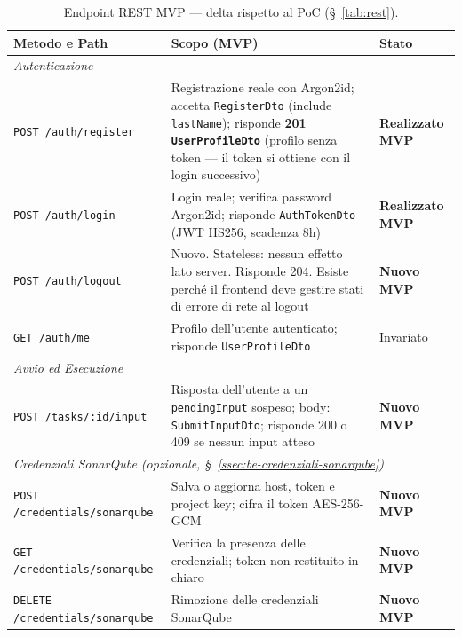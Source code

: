 \documentclass[11pt,a4paper]{article}
\begin{document}
\begin{table}[H]
\centering
\caption{Endpoint REST MVP --- delta rispetto al PoC (\S~\ref{tab:rest}).}
\label{tab:be-endpoint-delta}
\vspace{2mm}
\renewcommand{\arraystretch}{1.15}
\begin{tabularx}{\textwidth}{|l|X|l|}
\hline
\textbf{Metodo e Path} & \textbf{Scopo (MVP)} & \textbf{Stato} \\ \hline
\multicolumn{3}{|l|}{\textit{Autenticazione}} \\ \hline
\texttt{POST /auth/register} & Registrazione reale con Argon2id; accetta \texttt{RegisterDto} (include \texttt{lastName}); risponde \textbf{201 \texttt{UserProfileDto}} (profilo senza token --- il token si ottiene con il login successivo) & \textbf{Realizzato MVP} \\ \hline
\texttt{POST /auth/login} & Login reale; verifica password Argon2id; risponde \texttt{AuthTokenDto} (JWT HS256, scadenza 8h) & \textbf{Realizzato MVP} \\ \hline
\texttt{POST /auth/logout} & Nuovo. Stateless: nessun effetto lato server. Risponde 204. Esiste perché il frontend deve gestire stati di errore di rete al logout & \textbf{Nuovo MVP} \\ \hline
\texttt{GET /auth/me} & Profilo dell'utente autenticato; risponde \texttt{UserProfileDto} & Invariato \\ \hline
\multicolumn{3}{|l|}{\textit{Avvio ed Esecuzione}} \\ \hline
\texttt{POST /tasks/:id/input} & Risposta dell'utente a un \texttt{pendingInput} sospeso; body: \texttt{SubmitInputDto}; risponde 200 o 409 se nessun input atteso & \textbf{Nuovo MVP} \\ \hline
\multicolumn{3}{|l|}{\textit{Credenziali SonarQube (opzionale, \S~\ref{ssec:be-credenziali-sonarqube})}} \\ \hline
\texttt{POST /credentials/sonarqube} & Salva o aggiorna host, token e project key; cifra il token AES-256-GCM & \textbf{Nuovo MVP} \\ \hline
\texttt{GET /credentials/sonarqube} & Verifica la presenza delle credenziali; token non restituito in chiaro & \textbf{Nuovo MVP} \\ \hline
\texttt{DELETE /credentials/sonarqube} & Rimozione delle credenziali SonarQube & \textbf{Nuovo MVP} \\ \hline
\end{tabularx}
\end{table}
\end{document}
